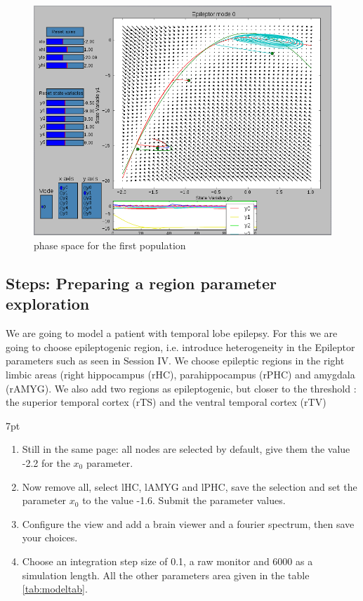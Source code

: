 \documentclass{tufte-handout}
\newenvironment{simulation}{%
  \def\FrameCommand{%
    \hspace{1pt}%
    {\color{ForestGreen}\vrule width 2pt}%
    {\color{simulationshade}\vrule width 4pt}%
    \colorbox{simulationshade}%
  }%
  \MakeFramed{\advance\hsize-\width\FrameRestore}%
  \noindent\hspace{-4.55pt}%
  \begin{adjustwidth}{}{7pt}%
  \vspace{2pt}\vspace{2pt}%
}
{%
  \vspace{2pt}\end{adjustwidth}\endMakeFramed%
}
\begin{document}
\begin{figure}[h]
  \includegraphics[width=\linewidth]{Handout_UI_ModellingAnEpilepticPatient_PhaseSpace}%
  \caption{phase space for the first population}%
  \label{fig:phase_space}%
\end{figure}
\subsection{Steps: Preparing a region parameter exploration }

We are going to model a patient with temporal lobe epilepsy. For this we are going to choose epileptogenic region, i.e. 
introduce heterogeneity in the Epileptor parameters such as seen in Session IV. We choose epileptic regions in the right limbic areas 
(right hippocampus (rHC), parahippocampus (rPHC) and amygdala (rAMYG). We also add two regions as epileptogenic, but closer
to the threshold : the superior temporal cortex (rTS) and the ventral temporal cortex (rTV)

\begin{simulation}
  \begin{enumerate}
  \item Still in the same page: all nodes are selected by default, give them the value -2.2 for the $x_0$ parameter.
  \item Now remove all, select lHC, lAMYG and lPHC, save the selection 
	and set the parameter $x_0$ to the value -1.6. Submit the parameter values.
  \item Configure the view and add a brain viewer and a fourier spectrum, then save your choices.
  \item Choose an integration step size of 0.1, a raw monitor and 6000 as a simulation length. All the other parameters area
  given in the table \ref{tab:modeltab}.
 \end{enumerate}
\end{simulation}
\end{document}
